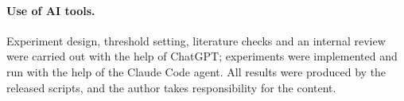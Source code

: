 \documentclass[11pt]{article}
\theoremstyle{definition}
\begin{document}
\paragraph{Use of AI tools.} Experiment design, threshold setting, literature
checks and an internal review were carried out with the help of ChatGPT;
experiments were implemented and run with the help of the Claude Code agent. All
results were produced by the released scripts, and the author takes responsibility
for the content.



\end{document}
